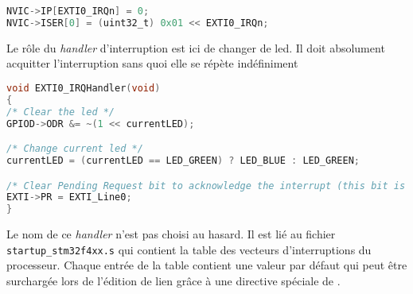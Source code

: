 \documentclass{FicheLecture}
\begin{document}
\begin{lstlisting}[language=C]
NVIC->IP[EXTI0_IRQn] = 0;
NVIC->ISER[0] = (uint32_t) 0x01 << EXTI0_IRQn;
\end{lstlisting}

Le rôle du \emph{handler} d'interruption est ici de changer de led. Il doit absolument acquitter l'interruption sans quoi elle se répète indéfiniment 

\begin{lstlisting}[language=C]
void EXTI0_IRQHandler(void)
{
/* Clear the led */
GPIOD->ODR &= ~(1 << currentLED);

/* Change current led */
currentLED = (currentLED == LED_GREEN) ? LED_BLUE : LED_GREEN;

/* Clear Pending Request bit to acknowledge the interrupt (this bit is cleared by programming it to 1 ! */
EXTI->PR = EXTI_Line0;
}
\end{lstlisting}

Le nom de ce \emph{handler} n'est pas choisi au hasard. Il est lié au fichier \texttt{startup\_stm32f4xx.s} qui contient la table des vecteurs d'interruptions du processeur. Chaque entrée de la table contient une valeur par défaut qui peut être surchargée lors de l'édition de lien grâce à une directive spéciale de .



\end{document}
